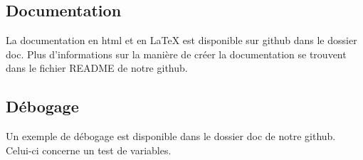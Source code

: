 \documentclass[10pt]{article}
\begin{document}
\subsection{Documentation}
La documentation en html et en LaTeX est disponible sur github dans le dossier doc. Plus d'informations sur la manière de créer la documentation se trouvent dans le fichier README de notre github.\\
\subsection{Débogage}
Un exemple de débogage est disponible dans le dossier doc de notre github. Celui-ci concerne un test de variables.\\
\end{document}
